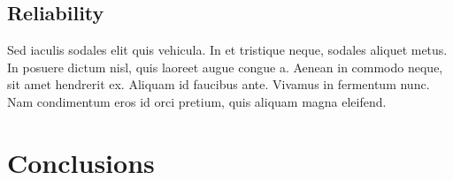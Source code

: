 \documentclass[article]{jss}
\begin{document}
\subsection[Reliablility]{Reliability}

 Sed iaculis sodales elit quis vehicula. In et tristique neque, sodales aliquet metus. In posuere dictum nisl, quis laoreet augue congue a. Aenean in commodo neque, sit amet hendrerit ex. Aliquam id faucibus ante. Vivamus in fermentum nunc. Nam condimentum eros id orci pretium, quis aliquam magna eleifend. 

\section[Conclusions]{Conclusions}
\end{document}
